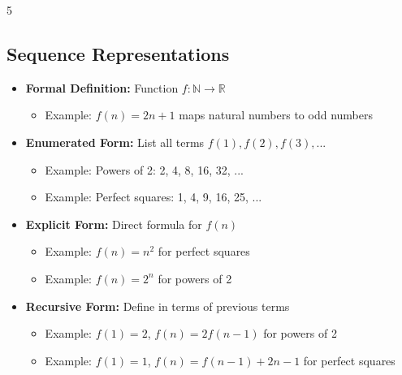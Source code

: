 \documentclass[a4paper,landscape]{article}
\begin{document}
\begin{multicols*}{5}
\subsection*{Sequence Representations}
\begin{itemize}[leftmargin=*, itemsep=0pt]
    \item \textbf{Formal Definition:} Function $f: \mathbb{N} \rightarrow \mathbb{R}$
        \begin{itemize}[leftmargin=*, itemsep=0pt]
            \item Example: $f(n) = 2n + 1$ maps natural numbers to odd numbers
        \end{itemize}
    \item \textbf{Enumerated Form:} List all terms $f(1), f(2), f(3), ...$
        \begin{itemize}[leftmargin=*, itemsep=0pt]
            \item Example: Powers of 2: 2, 4, 8, 16, 32, ...
            \item Example: Perfect squares: 1, 4, 9, 16, 25, ...
        \end{itemize}
    \item \textbf{Explicit Form:} Direct formula for $f(n)$
        \begin{itemize}[leftmargin=*, itemsep=0pt]
            \item Example: $f(n) = n^2$ for perfect squares
            \item Example: $f(n) = 2^n$ for powers of 2
        \end{itemize}
    \item \textbf{Recursive Form:} Define in terms of previous terms
        \begin{itemize}[leftmargin=*, itemsep=0pt]
            \item Example: $f(1)=2$, $f(n)=2f(n-1)$ for powers of 2
            \item Example: $f(1)=1$, $f(n)=f(n-1)+2n-1$ for perfect squares
        \end{itemize}
\end{itemize}


\end{multicols*}
\end{document}
